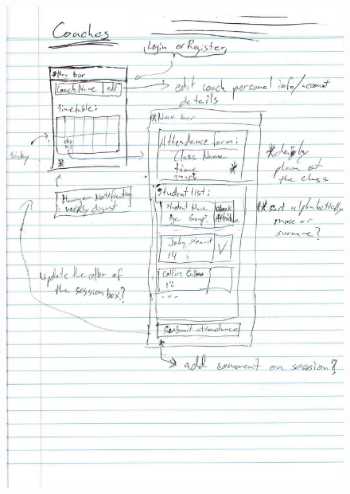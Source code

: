 \documentclass{l3proj}
\begin{document}
{
\begin{figure}[h]
\centering
\includegraphics[scale=0.50]{0085_001-page-010.jpg}
\end{figure}
}

\pagebreak
\end{document}
